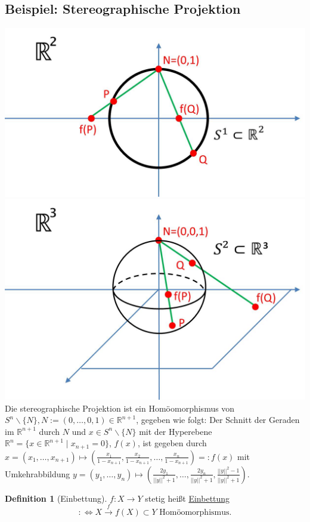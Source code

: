 \documentclass[a4paper,11pt,notitlepage]{report}
\theoremstyle{remark}
\theoremstyle{definition}
\newtheorem{definition}{Definition}[chapter]
\newcommand{\R}{{\ensuremath{\mathbb{R}}}}
\newenvironment{bsp}[1]
{
\setlength{\fboxsep}{10pt}
\subsection*{Beispiel: #1}
\begin{upshape}
}
{
\end{upshape}
}
\begin{document}
\begin{bsp}{Stereographische Projektion}
	\includegraphics[scale=0.35]{images/Stereographie_S1_R1.jpg}
	\includegraphics[scale=0.35]{images/Stereographie_S2_R2.jpg}
	\newline
	Die stereographische Projektion ist ein Homöomorphismus von $S^n \backslash \{N\}, N := (0, \ldots, 0, 1) \in \R^{n+1}$, gegeben wie folgt:
	\newline
	Der Schnitt der Geraden im $\R^{n+1}$ durch $N$ und $x \in S^n \backslash \{N\}$ mit der Hyperebene $\R^n=\{x \in \R^{n+1} \mid x_{n+1} = 0 \}$, $f(x)$, ist gegeben durch $x = (x_1, \ldots, x_{n+1}) \mapsto (\frac{x_1}{1-x_{n+1}}, \frac{x_2}{1-x_{n+1}}, \ldots, \frac{x_n}{1-x_{n+1}}) =: f(x)$ mit Umkehrabbildung $y = (y_1, \ldots, y_n) \mapsto (\frac{2 y_1}{||y||^2+1}, \ldots, \frac{2 y_n}{||y||^2+1},\frac{||y||^2-1}{||y||^2+1})$.
\end{bsp}

\begin{definition}[Einbettung]
	$f \colon X \rightarrow Y$ stetig heißt \underline{Einbettung} $$:\Leftrightarrow X \overset{f}{\rightarrow}f(X) \subset Y \text{ Homöomorphismus.}$$
\end{definition}
\end{document}
